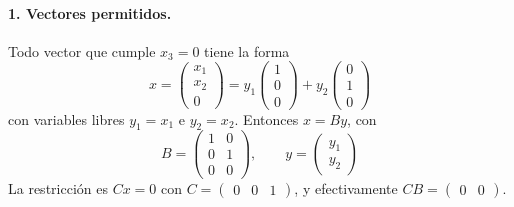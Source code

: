 \documentclass{article}
\begin{document}
\paragraph*{1. Vectores permitidos.}
Todo vector que cumple \(x_3=0\) tiene la forma
\[
x=
\begin{pmatrix}
x_1\\
x_2\\
0
\end{pmatrix}
=
y_1
\begin{pmatrix}
1\\
0\\
0
\end{pmatrix}
+
y_2
\begin{pmatrix}
0\\
1\\
0
\end{pmatrix}
\]
con variables libres \(y_1=x_1\) e \(y_2=x_2\). Entonces \(x=By\), con
\[
B=
\begin{pmatrix}
1 & 0\\
0 & 1\\
0 & 0
\end{pmatrix},
\qquad
y=
\begin{pmatrix}
y_1\\
y_2
\end{pmatrix}
\]
La restricción es \(Cx=0\) con \(C=\begin{pmatrix}0 & 0 & 1\end{pmatrix}\), y efectivamente \(CB=\begin{pmatrix}0 & 0\end{pmatrix}\).
\end{document}
